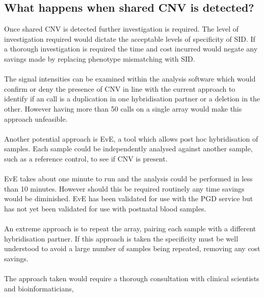 \subsection{What happens when shared CNV is detected?}
Once shared CNV is detected further investigation is required. The level of investigation required would dictate the acceptable levels of specificity of SID. If a thorough investigation is required the time and cost incurred would negate any savings made by replacing phenotype mismatching with SID.
\paragraph*{}
The signal intensities can be examined within the analysis software which would confirm or deny the presence of CNV in line with the current approach to identify if an call is a duplication in one hybridisation partner or a deletion in the other. However having more than 50 calls on a single array would make this approach unfeasible.
\paragraph*{}
Another potential approach is EvE, a tool which allows post hoc hybridisation of samples. Each sample could be independently analysed against another sample, such as a reference control, to see if CNV is present. 
\paragraph*{}
EvE takes about one minute to run and the analysis could be performed in less than 10 minutes. However should this be required routinely any time savings would be diminished.
EvE has been validated for use with the PGD service but has not yet been validated for use with postnatal blood samples.
\paragraph*{}
An extreme approach is to repeat the array, pairing each sample with a different hybridisation partner. If this approach is taken the specificity must be well understood to avoid a large number of samples being repeated, removing any cost savings.
\paragraph*{}
The approach taken would require a thorough consultation with clinical scientists and bioinformaticians,

